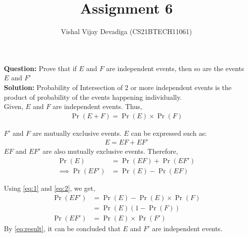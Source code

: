 \documentclass[journal,12pt,twocolumn]{IEEEtran}
\title{Assignment 6}
\author{Vishal Vijay Devadiga (CS21BTECH11061)}
\date{}
\providecommand{\pr}[1]{\ensuremath{\Pr\left(#1\right)}}
\providecommand{\brak}[1]{\ensuremath{\left(#1\right)}}
\newcommand{\question}{\noindent \textbf{Question: }}
\newcommand{\solution}{\noindent \textbf{Solution: }}
\begin{document}
\maketitle

\question
Prove that if $E$ and $F$ are independent events, then so are the events $E$ and $F'$ \\
\solution
Probability of Intersection of 2 or more independent events is the product of probability of the events happening individually. \\
Given, $E$ and $F$ are independent events. Thus,
\begin{align}
	\label{eq:1}
	\pr{E + F} = \pr{E} \times \pr{F}
\end{align}

$F'$ and $F$ are mutually exclusive events. $E$ can be expressed such as:
\begin{align}
	E = EF + EF'
\end{align}
$EF$ and $EF'$ are also mutually exclusive events. Therefore,
\begin{align}
	\pr{E}            & = \pr{EF} + \pr{EF'}
	\\
	\label{eq:2}
	\implies \pr{EF'} & = \pr{E} - \pr{EF}
\end{align}


Using \eqref{eq:1} and \eqref{eq:2}, we get,
\begin{align}
	\pr{EF'} & = \pr{E} - \pr{E} \times \pr{F}
	\\
	         & = \pr{E}\brak{1 - \pr{F}}
	\\
	\label{eq:result}
	\pr{EF'} & = \pr{E} \times \pr{F'}
\end{align}
By \eqref{eq:result}, it can be concluded that $E$ and $F'$ are independent events.
\end{document}

